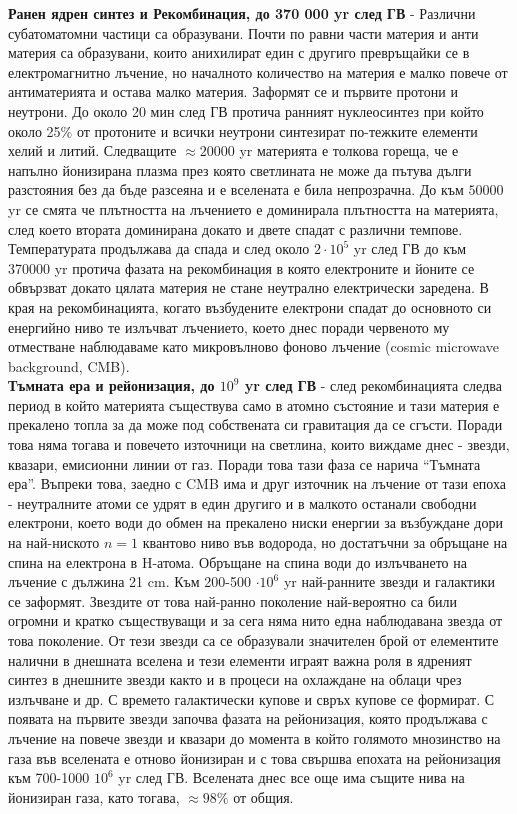 \documentclass[a4paper,12pt]{article}
\begin{document}
\textbf{Ранен ядрен синтез и Рекомбинация, до 370 000 yr след ГВ} - Различни субатоматомни частици са образувани. Почти по равни части материя и анти материя са образувани, които анихилират един с другиго превръщайки се в електромагнитно лъчение, но началното количество на материя е малко повече от антиматерията и остава малко материя. Заформят се и първите протони и неутрони. До около 20 мин след ГВ протича ранният нуклеосинтез при който около 25\% от протоните и всички неутрони синтезират по-тежките елементи хелий и литий. Следващите $\approx 20000$ yr материята е толкова гореща, че е напълно йонизирана плазма през която светлината не може да пътува дълги разстояния без да бъде разсеяна и е вселената е била непрозрачна. До към $50000$ yr се смята че плътността на лъчението е доминирала плътността на материята, след което втората доминирана докато и двете спадат с различни темпове. Температурата продължава да спада и след около $2 \cdot 10^5$ yr след ГВ до към 370000 yr протича фазата на рекомбинация в която електроните и йоните се обвързват докато цялата материя не стане неутрално електрически заредена. В края на рекомбинацията, когато възбудените електрони спадат до основното си енергийно ниво те излъчват лъчението, което днес поради червеното му отместване наблюдаваме като микровълново фоново лъчение (cosmic microwave background, CMB).\\

\textbf{Тъмната ера и рейонизация, до $10^9$ yr след ГВ} - след рекомбинацията следва период в който материята съществува само в атомно състояние и тази материя е прекалено топла за да може под собствената си гравитация да се сгъсти. Поради това няма тогава и повечето източници на светлина, които виждаме днес - звезди, квазари, емисионни линии от газ. Поради това тази фаза се нарича ``Тъмната ера''. Въпреки това, заедно с CMB има и друг източник на лъчение от тази епоха - неутралните атоми се удрят в един другиго и в малкото останали свободни електрони, което води до обмен на прекалено ниски енергии за възбуждане дори на най-ниското $n=1$ квантово ниво във водорода, но достатъчни за обръщане на спина на електрона в H-атома. Обръщане на спина води до излъчването на лъчение с дължина 21 cm. Към 200-500 $\cdot 10^6$ yr най-ранните звезди и галактики се заформят. Звездите от това най-ранно поколение най-вероятно са били огромни и кратко съществуващи и за сега няма нито една наблюдавана звезда от това поколение. От тези звезди са се образували значителен брой от елементите налични в днешната вселена и тези елементи играят важна роля в ядреният синтез в днешните звезди както и в процеси на охлаждане на облаци чрез излъчване и др. С времето галактически купове и свръх купове се формират. С появата на първите звезди започва фазата на рейонизация, която продължава с лъчение на повече звезди и квазари до момента в който голямото мнозинство на газа във вселената е отново йонизиран и с това свършва епохата на рейонизация към 700-1000 $10^6$ yr след ГВ. Вселената днес все още има същите нива на йонизиран газа, като тогава, $\approx 98\%$ от общия.\\
\end{document}
